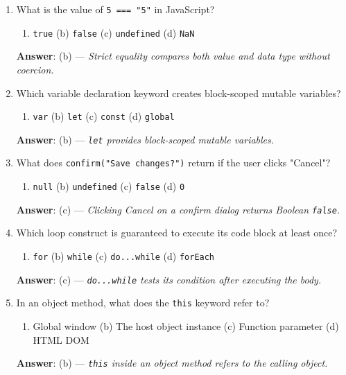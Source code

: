 \begin{enumerate}[leftmargin=1.5em]
    \item What is the value of \texttt{5 === "5"} in JavaScript?
    \begin{enumerate}[label=(\alph*)]
        \item \texttt{true} \quad (b) \texttt{false} \quad (c) \texttt{undefined} \quad (d) \texttt{NaN}
    \end{enumerate}
    \textbf{Answer}: (b) --- \textit{Strict equality compares both value and data type without coercion.}

    \item Which variable declaration keyword creates block-scoped mutable variables?
    \begin{enumerate}[label=(\alph*)]
        \item \texttt{var} \quad (b) \texttt{let} \quad (c) \texttt{const} \quad (d) \texttt{global}
    \end{enumerate}
    \textbf{Answer}: (b) --- \textit{\texttt{let} provides block-scoped mutable variables.}

    \item What does \texttt{confirm("Save changes?")} return if the user clicks "Cancel"?
    \begin{enumerate}[label=(\alph*)]
        \item \texttt{null} \quad (b) \texttt{undefined} \quad (c) \texttt{false} \quad (d) \texttt{0}
    \end{enumerate}
    \textbf{Answer}: (c) --- \textit{Clicking Cancel on a confirm dialog returns Boolean \texttt{false}.}

    \item Which loop construct is guaranteed to execute its code block at least once?
    \begin{enumerate}[label=(\alph*)]
        \item \texttt{for} \quad (b) \texttt{while} \quad (c) \texttt{do...while} \quad (d) \texttt{forEach}
    \end{enumerate}
    \textbf{Answer}: (c) --- \textit{\texttt{do...while} tests its condition after executing the body.}

    \item In an object method, what does the \texttt{this} keyword refer to?
    \begin{enumerate}[label=(\alph*)]
        \item Global window \quad (b) The host object instance \quad (c) Function parameter \quad (d) HTML DOM
    \end{enumerate}
    \textbf{Answer}: (b) --- \textit{\texttt{this} inside an object method refers to the calling object.}


\end{enumerate}
